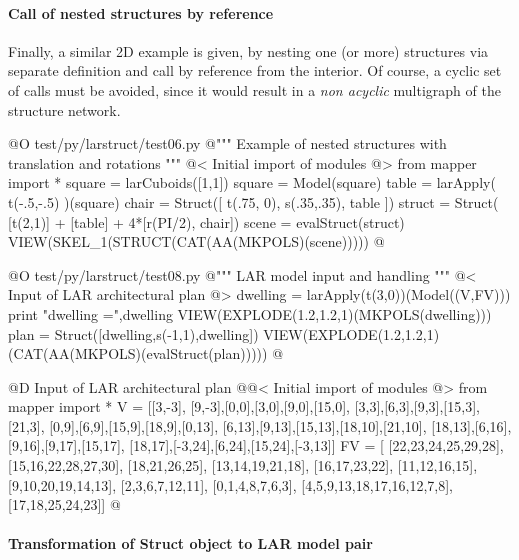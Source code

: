 \documentclass[11pt,oneside]{article}    %
\begin{document}
\paragraph{Call of nested structures by reference}
Finally, a similar 2D example is given, by nesting one (or more) structures via separate definition and call by reference from the interior. Of course, a cyclic set of calls must be avoided, since it would result in a \emph{non acyclic} multigraph of the structure network.

@O test/py/larstruct/test06.py
@{""" Example of nested structures with translation and rotations """
@< Initial import of modules @>
from mapper import *
square = larCuboids([1,1])
square = Model(square)
table = larApply( t(-.5,-.5) )(square)
chair = Struct([ t(.75, 0), s(.35,.35), table ])
struct = Struct( [t(2,1)] + [table] + 4*[r(PI/2), chair])
scene = evalStruct(struct)
VIEW(SKEL_1(STRUCT(CAT(AA(MKPOLS)(scene)))))
@}


@O test/py/larstruct/test08.py
@{""" LAR model input and handling """
@< Input of LAR architectural plan @>
dwelling = larApply(t(3,0))(Model((V,FV)))
print "\n dwelling =",dwelling
VIEW(EXPLODE(1.2,1.2,1)(MKPOLS(dwelling)))
plan = Struct([dwelling,s(-1,1),dwelling])
VIEW(EXPLODE(1.2,1.2,1)(CAT(AA(MKPOLS)(evalStruct(plan)))))
@}



@D Input of LAR architectural plan
@{@< Initial import of modules @>
from mapper import *
V = [[3,-3],
[9,-3],[0,0],[3,0],[9,0],[15,0],
[3,3],[6,3],[9,3],[15,3],[21,3], 
[0,9],[6,9],[15,9],[18,9],[0,13],
[6,13],[9,13],[15,13],[18,10],[21,10], 
[18,13],[6,16],[9,16],[9,17],[15,17],
[18,17],[-3,24],[6,24],[15,24],[-3,13]]
FV = [
[22,23,24,25,29,28], [15,16,22,28,27,30], [18,21,26,25], 
[13,14,19,21,18], [16,17,23,22], [11,12,16,15],
[9,10,20,19,14,13], [2,3,6,7,12,11], [0,1,4,8,7,6,3],
[4,5,9,13,18,17,16,12,7,8],[17,18,25,24,23]]
@}



\paragraph{Transformation of Struct object to LAR model pair}
\end{document}
